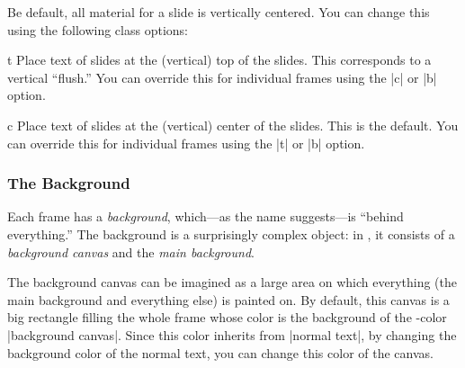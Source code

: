
Be default, all material for a slide is vertically centered. You can
change this using the following class options:

\begin{classoption}{t}
  Place text of slides at the (vertical) top of the slides. This
  corresponds to a vertical ``flush.'' You can override this for
  individual frames using the |c| or |b| option.
\end{classoption}

\begin{classoption}{c}
  Place text of slides at the (vertical) center of the slides. This is
  the default. You can override this for
  individual frames using the |t| or |b| option.
\end{classoption}


\subsubsection{The Background}
\label{section-canvas}
\label{section-background}

Each frame has a \emph{background}, which---as the name suggests---is
``behind everything.'' The background is a surprisingly complex
object: in \beamer, it consists of a \emph{background canvas} and the
\emph{main background}.

\appearancenote
The background canvas can be imagined as a large area on which
everything (the main background and everything else) is painted on. By
default, this canvas is a big rectangle filling the whole frame whose
color is the background of the \beamer-color
|background canvas|. Since this color inherits from |normal text|, by
changing the background color of the normal text, you can change this
color of the canvas.

